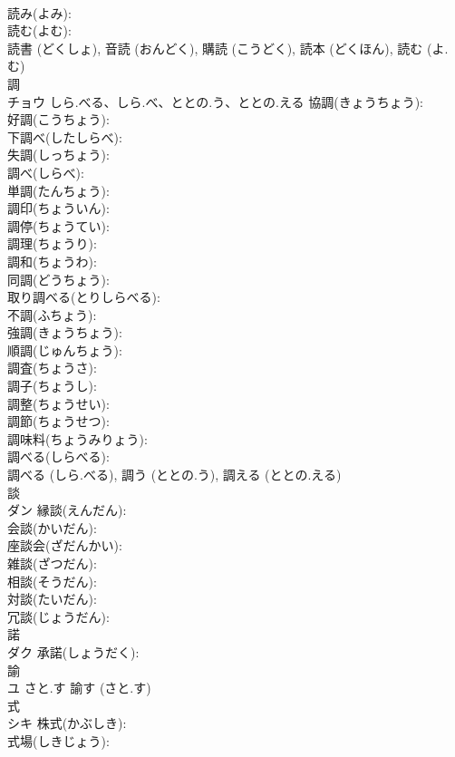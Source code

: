 \documentclass[8pt]{extreport}
\begin{document}
\begin{CJK}{UTF8}{min}
\\	読み(よみ): 
\\	読む(よむ): 
\\	読書 (どくしょ), 音読 (おんどく), 購読 (こうどく), 読本 (どくほん), 読む (よ.む)
\\	調			
\\	チョウ	しら.べる、しら.べ、ととの.う、ととの.える	協調(きょうちょう): 
\\	好調(こうちょう): 
\\	下調べ(したしらべ): 
\\	失調(しっちょう): 
\\	調べ(しらべ): 
\\	単調(たんちょう): 
\\	調印(ちょういん): 
\\	調停(ちょうてい): 
\\	調理(ちょうり): 
\\	調和(ちょうわ): 
\\	同調(どうちょう): 
\\	取り調べる(とりしらべる): 
\\	不調(ふちょう): 
\\	強調(きょうちょう): 
\\	順調(じゅんちょう): 
\\	調査(ちょうさ): 
\\	調子(ちょうし): 
\\	調整(ちょうせい): 
\\	調節(ちょうせつ): 
\\	調味料(ちょうみりょう): 
\\	調べる(しらべる): 
\\	調べる (しら.べる), 調う (ととの.う), 調える (ととの.える)
\\	談			
\\	ダン		縁談(えんだん): 
\\	会談(かいだん): 
\\	座談会(ざだんかい): 
\\	雑談(ざつだん): 
\\	相談(そうだん): 
\\	対談(たいだん): 
\\	冗談(じょうだん): 
\\	諾			
\\	ダク		承諾(しょうだく): 
\\	諭			
\\	ユ	さと.す		諭す (さと.す)
\\	式			
\\	シキ		株式(かぶしき): 
\\	式場(しきじょう): 

\end{CJK}
\end{document}
